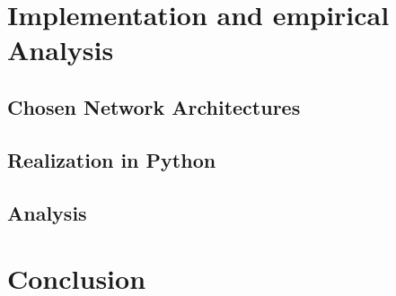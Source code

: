 \documentclass[a4paper,12pt,titlepage,enabledeprecatedfontcommands]{scrreprt}
\begin{document}
\chapter{Implementation and empirical Analysis}
\section{Chosen Network Architectures}
\section{Realization in Python}
\section{Analysis}
\chapter{Conclusion}
\cite{Goodfellow-et-al-2016}


 \label{bibtex}
\end{document}
